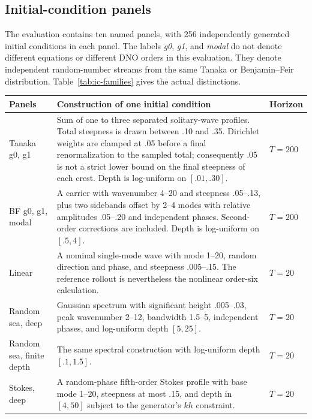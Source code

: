 \documentclass[11pt]{article}
\begin{document}
\subsection{Initial-condition panels}

The evaluation contains ten named panels, with 256 independently generated
initial conditions in each panel.  The labels \emph{g0}, \emph{g1}, and
\emph{modal} do not denote different equations or different DNO orders in
this evaluation.  They denote independent random-number streams from the same
Tanaka or Benjamin--Feir distribution.  Table~\ref{tab:ic-families} gives the
actual distinctions.

\begin{table}[htbp]
\centering
\small
\begin{tabularx}{\textwidth}{p{}X p{}}
\toprule
Panels & Construction of one initial condition & Horizon \\
\midrule
Tanaka g0, g1
& Sum of one to three separated solitary-wave profiles.  Total steepness is
drawn between .10 and .35.  Dirichlet weights are clamped at .05 before a
final renormalization to the sampled total; consequently .05 is not a strict
lower bound on the final steepness of each crest.  Depth is log-uniform on
$[.01,.30]$.
& $T=200$ \\

BF g0, g1, modal
& A carrier with wavenumber 4--20 and steepness .05--.13, plus two sidebands
offset by 2--4 modes with relative amplitudes .05--.20 and independent phases.
Second-order corrections are included.  Depth is log-uniform on $[.5,4]$.
& $T=200$ \\

Linear
& A nominal single-mode wave with mode 1--20, random direction and phase, and
steepness .005--.15.  The reference rollout is nevertheless the nonlinear
order-six calculation.
& $T=20$ \\

Random sea, deep
& Gaussian spectrum with significant height .005--.03, peak wavenumber 2--12,
bandwidth 1.5--5, independent phases, and log-uniform depth $[5,25]$.
& $T=20$ \\

Random sea, finite depth
& The same spectral construction with log-uniform depth $[.1,1.5]$.
& $T=20$ \\

Stokes, deep
& A random-phase fifth-order Stokes profile with base mode 1--20, steepness at
most .15, and depth in $[4,50]$ subject to the generator's $kh$ constraint.
& $T=20$ \\


\end{tabularx}
\end{table}
\end{document}
